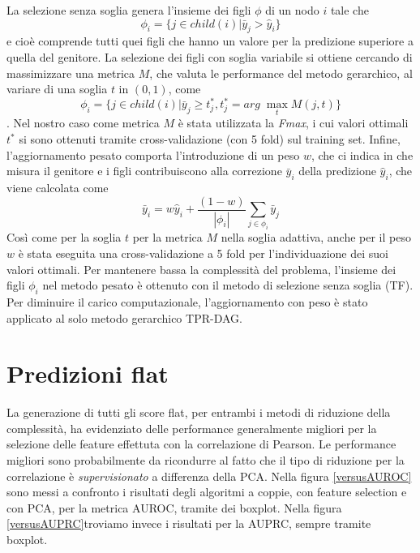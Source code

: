\documentclass[12pt]{report}
\begin{document}
La selezione senza soglia genera l'insieme dei figli $\phi$ di un nodo $i$ tale che
\[
\phi_i = \{j \in child(i) | \bar{y}_j > \hat{y}_i \}
\]
e cioè comprende tutti quei figli che hanno un valore per la predizione superiore a quella del genitore.
\newline
\newline
La selezione dei figli con soglia variabile  si ottiene cercando di massimizzare una metrica $M$, che valuta le performance del metodo gerarchico, al variare di una soglia $t$ in $(0,1)$, come 
\[
\phi_i = \{j \in child(i) | \bar{y}_j \geq t_j^{*}, t_j^{*} = arg\;\max_{t} M(j, t)   \}
\]
. Nel nostro caso come metrica $M$ è stata utilizzata la \emph{Fmax}, i cui valori ottimali $t^{*}$  si sono ottenuti tramite cross-validazione (con 5 fold) sul training set.
\newline
\newline
Infine, l'aggiornamento pesato comporta l'introduzione di un peso $w$, che ci indica in che misura il genitore e i figli contribuiscono alla correzione $\bar{y}_i$ della predizione $\hat{y}_i$, che viene calcolata come
\[
\bar{y}_i = w \hat{y}_i + \frac{(1-w)}{|\phi_i|}\sum_{j \in \phi_i}\bar{y}_j
\]
Così come per la soglia $t$ per la metrica $M$ nella soglia adattiva, anche per il peso $w$ è stata eseguita una cross-validazione a 5 fold per l'individuazione dei suoi valori ottimali. Per mantenere bassa la complessità del problema, l'insieme dei figli $\phi_i$ nel metodo pesato è ottenuto con il metodo di selezione senza soglia (TF). Per diminuire il carico computazionale, l'aggiornamento con peso è stato applicato al solo metodo gerarchico TPR-DAG.

\section{Predizioni flat}
La generazione di tutti gli score flat, per entrambi i metodi di riduzione della complessità, ha evidenziato delle performance generalmente migliori per la selezione delle feature effettuta con la correlazione di Pearson. Le performance migliori sono probabilmente da ricondurre al fatto che il tipo di riduzione per la correlazione è \emph{supervisionato} a differenza della PCA.
\newline
\newline
Nella figura \ref{versusAUROC} sono messi a confronto i risultati degli algoritmi a coppie, con feature selection e con PCA, per la metrica AUROC, tramite dei boxplot. Nella figura \ref{versusAUPRC}troviamo invece i risultati per la AUPRC, sempre tramite boxplot.
\end{document}
